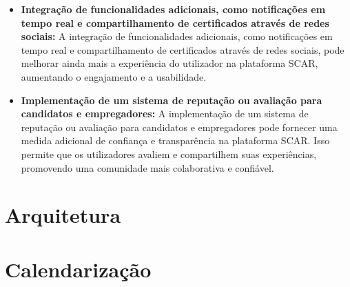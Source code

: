 \documentclass[10pt]{article}
\begin{document}
\begin{itemize}

    \item\textbf{Integração de funcionalidades adicionais, como notificações em tempo real e compartilhamento de certificados
através de redes sociais:} A integração de funcionalidades adicionais, como notificações em tempo real e
compartilhamento de certificados através de redes sociais, pode melhorar ainda mais a experiência do
utilizador na plataforma SCAR, aumentando o engajamento e a usabilidade.

    \item\textbf{Implementação de um sistema de reputação ou avaliação para candidatos e empregadores:} A implementação de um
sistema de reputação ou avaliação para candidatos e empregadores pode fornecer uma medida adicional de
confiança e transparência na plataforma SCAR. Isso permite que os utilizadores avaliem e compartilhem suas
experiências, promovendo uma comunidade mais colaborativa e confiável.

\end{itemize}

\section{Arquitetura}

\pagebreak

\section{Calendarização}
\end{document}
